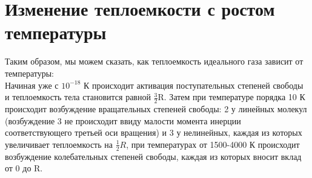 \documentclass{article}
\begin{document}
\section{Изменение теплоемкости с ростом температуры}
Таким образом, мы можем сказать, как теплоемкость идеального газа зависит от температуры:\\
Начиная уже с $10^{-18}$ К происходит активация поступательных степеней свободы и теплоемкость тела становится равной $\frac{3}{2}$R. Затем при температуре порядка 10 К происходит возбуждение вращательных степеней свободы: 2 у линейных молекул (возбуждение 3 не происходит ввиду малости момента инерции соответствующего третьей оси вращения) и 3 у нелинейных, каждая из которых увеличивает теплоемкость на $\frac{1}{2}R$, при температурах от 1500-4000 К происходит возбуждение колебательных степеней свободы, каждая из которых вносит вклад от 0 до R.
\end{document}
